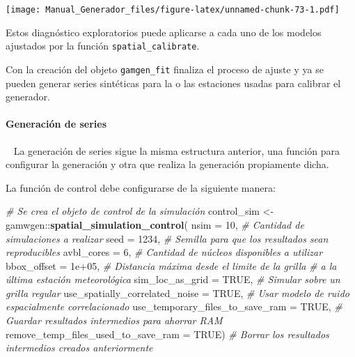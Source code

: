 \documentclass[
  12pt]{article}
\newenvironment{Shaded}{}{}
\newcommand{\CommentTok}[1]{\textcolor[rgb]{0.38,0.63,0.69}{\textit{#1}}}
\newcommand{\DataTypeTok}[1]{\textcolor[rgb]{0.56,0.13,0.00}{#1}}
\newcommand{\DecValTok}[1]{\textcolor[rgb]{0.25,0.63,0.44}{#1}}
\newcommand{\FloatTok}[1]{\textcolor[rgb]{0.25,0.63,0.44}{#1}}
\newcommand{\KeywordTok}[1]{\textcolor[rgb]{0.00,0.44,0.13}{\textbf{#1}}}
\newcommand{\NormalTok}[1]{#1}
\newcommand{\OperatorTok}[1]{\textcolor[rgb]{0.40,0.40,0.40}{#1}}
\newcommand{\OtherTok}[1]{\textcolor[rgb]{0.00,0.44,0.13}{#1}}
\newcommand{\StringTok}[1]{\textcolor[rgb]{0.25,0.44,0.63}{#1}}
\begin{document}
\begin{Shaded}
\end{Shaded}

\texttt{[image: Manual\_Generador\_files/figure-latex/unnamed-chunk-73-1.pdf]}

Estos diagnóstico exploratorios puede aplicarse a cada uno de los modelos ajustados por la función \texttt{spatial\_calibrate}.

Con la creación del objeto \texttt{gamgen\_fit} finaliza el proceso de ajuste y ya se pueden generar series sintéticas para la o las estaciones usadas para calibrar el generador.

\hypertarget{generaciuxf3n-de-series-4}{%
\paragraph{Generación de series}\label{generaciuxf3n-de-series-4}}

~
La generación de series sigue la misma estructura anterior, una función para configurar la generación y otra que realiza la generación propiamente dicha.

La función de control debe configurarse de la siguiente manera:

\begin{Shaded}
\begin{Highlighting}[]
\CommentTok{# Se crea el objeto de control de la simulación}
\NormalTok{control_sim <-}\StringTok{ }\NormalTok{gamwgen}\OperatorTok{::}\KeywordTok{spatial_simulation_control}\NormalTok{(}
  \DataTypeTok{nsim =} \DecValTok{10}\NormalTok{, }
  \CommentTok{# Cantidad de simulaciones a realizar}
  \DataTypeTok{seed =} \DecValTok{1234}\NormalTok{, }
  \CommentTok{# Semilla para que los resultados sean reproducibles}
  \DataTypeTok{avbl_cores =} \DecValTok{6}\NormalTok{, }
  \CommentTok{# Cantidad de núcleos disponibles a utilizar}
  \DataTypeTok{bbox_offset =} \FloatTok{1e+05}\NormalTok{,}
  \CommentTok{# Distancia máxima desde el limite de la grilla }
  \CommentTok{# a la última estación meteorológica}
  \DataTypeTok{sim_loc_as_grid =} \OtherTok{TRUE}\NormalTok{,}
  \CommentTok{# Simular sobre un grilla regular}
  \DataTypeTok{use_spatially_correlated_noise =} \OtherTok{TRUE}\NormalTok{, }
  \CommentTok{# Usar modelo de ruido espacialmente correlacionado}
  \DataTypeTok{use_temporary_files_to_save_ram =} \OtherTok{TRUE}\NormalTok{, }
  \CommentTok{# Guardar resultados intermedios para ahorrar RAM}
  \DataTypeTok{remove_temp_files_used_to_save_ram =} \OtherTok{TRUE}\NormalTok{) }
\CommentTok{# Borrar los resultados intermedios creados anteriormente}
\end{Highlighting}
\end{Shaded}
\end{document}

